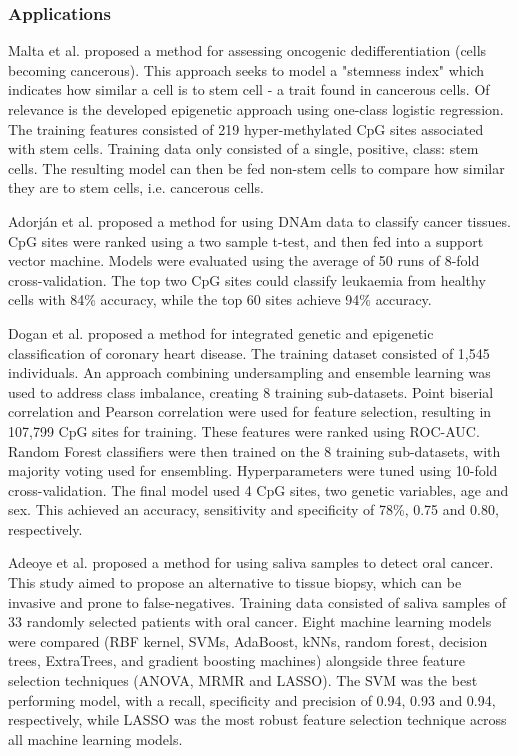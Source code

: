 \documentclass{article} %
\begin{document}
\subsubsection{Applications} \label{sec:ml-examples}

Malta et al. \cite{malta2018machine} proposed a method for assessing oncogenic dedifferentiation (cells becoming cancerous). This approach seeks to model a "stemness index" which indicates how similar a cell is to stem cell - a trait found in cancerous cells. Of relevance is the developed epigenetic approach using one-class logistic regression. The training features consisted of 219 hyper-methylated CpG sites associated with stem cells. Training data only consisted of a single, positive, class: stem cells. The resulting model can then be fed non-stem cells to compare how similar they are to stem cells, i.e. cancerous cells.

Adorj\'an et al. \cite{adorjan2002tumour} proposed a method for using DNAm data to classify cancer tissues. CpG sites were ranked using a two sample t-test, and then fed into a support vector machine. Models were evaluated using the average of 50 runs of 8-fold cross-validation. The top two CpG sites could classify leukaemia from healthy cells with 84\% accuracy, while the top 60 sites achieve 94\% accuracy.

Dogan et al. \cite{dogan2018integrated} proposed a method for integrated genetic and epigenetic classification of coronary heart disease. The training dataset consisted of 1,545 individuals. An approach combining undersampling and ensemble learning \cite{liu2008exploratory} was used to address class imbalance, creating 8 training sub-datasets. Point biserial correlation and Pearson correlation were used for feature selection, resulting in 107,799 CpG sites for training. These features were ranked using ROC-AUC. Random Forest classifiers were then trained on the 8 training sub-datasets, with majority voting used for ensembling. Hyperparameters were tuned using 10-fold cross-validation. The final model used 4 CpG sites, two genetic variables, age and sex. This achieved an accuracy, sensitivity and specificity of 78\%, 0.75 and 0.80, respectively.

Adeoye et al. \cite{adeoye2022machine} proposed a method for using saliva samples to detect oral cancer. This study aimed to propose an alternative to tissue biopsy, which can be invasive and prone to false-negatives. Training data consisted of saliva samples of 33 randomly selected patients with oral cancer. Eight machine learning models were compared (RBF kernel, SVMs, AdaBoost, kNNs, random forest, decision trees, ExtraTrees, and gradient boosting machines) alongside three feature selection techniques (ANOVA, MRMR and LASSO). The SVM was the best performing model, with a recall, specificity and precision of 0.94, 0.93 and 0.94, respectively, while LASSO was the most robust feature selection technique across all machine learning models.
\end{document}
